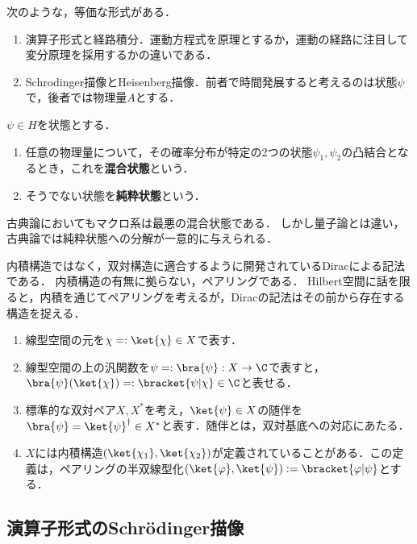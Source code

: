 \documentclass[uplatex,dvipdfmx]{jsreport}
\begin{document}
\begin{example}
    次のような，等価な形式がある．
    \begin{enumerate}
        \item 演算子形式と経路積分．運動方程式を原理とするか，運動の経路に注目して変分原理を採用するかの違いである．
        \item Schrodinger描像とHeisenberg描像．前者で時間発展すると考えるのは状態$\psi$で，後者では物理量$A$とする．
    \end{enumerate}
\end{example}

\begin{definition}[state]
    $\psi\in H$を状態とする．
    \begin{enumerate}
        \item 任意の物理量について，その確率分布が特定の2つの状態$\psi_1,\psi_2$の凸結合となるとき，これを\textbf{混合状態}という．
        \item そうでない状態を\textbf{純粋状態}という．
    \end{enumerate}
    古典論においてもマクロ系は最悪の混合状態である．
    しかし量子論とは違い，古典論では純粋状態への分解が一意的に与えられる．
\end{definition}

\begin{notation}[bracket記法]
    内積構造ではなく，双対構造に適合するように開発されているDiracによる記法である．
    内積構造の有無に拠らない，ペアリングである．
    Hilbert空間に話を限ると，内積を通じてペアリングを考えるが，Diracの記法はその前から存在する構造を捉える．
    \begin{enumerate}
        \item 線型空間の元を$\chi=:\ket{\chi}\in X$で表す．
        \item 線型空間の上の汎関数を$\psi=:\bra{\psi}:X\to\C$で表すと，$\bra{\psi}(\ket{\chi})=:\bracket{\psi|\chi}\in\C$と表せる．
        \item 標準的な双対ペア$X,X^*$を考え，$\ket{\psi}\in X$の随伴を$\bra{\psi}=\ket{\psi}^\dagger\in X^*$と表す．随伴とは，双対基底への対応にあたる．
        \item $X$には内積構造$(\ket{\chi_1},\ket{\chi_2})$が定義されていることがある．この定義は，ペアリングの半双線型化$(\ket{\varphi},\ket{\psi}):=\bracket{\varphi|\psi}$とする．
    \end{enumerate}
\end{notation}

\subsection{演算子形式のSchrödinger描像}
\end{document}
